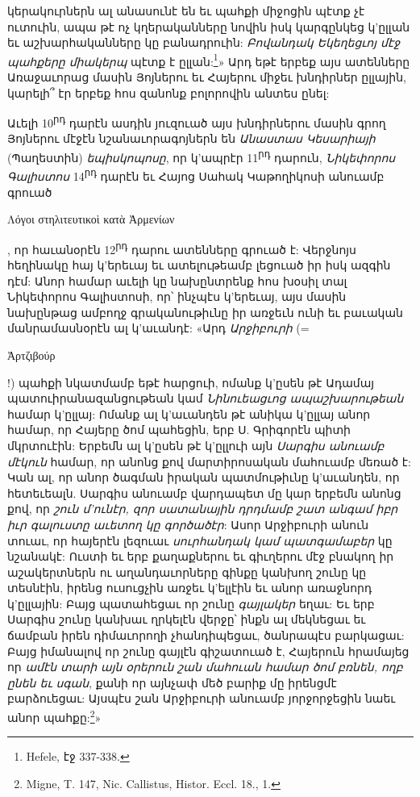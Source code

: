 \documentclass{article}
\begin{document}
{կերակուրներն ալ անասունէ են եւ պահքի միջոցին պէտք չէ ուտուին, ապա թէ ոչ կղերականները նովին իսկ կարգընկեց կ'ըլլան եւ աշխարհականները կը բանադրուին: \emph{Բովանդակ Եկեղեցւոյ մէջ պահքերը միակերպ} պէտք է ըլլան:\footnote{Hefele, էջ 337-338.}» Արդ եթէ երբեք այս ատենները Առաջաւորաց մասին Յոյներու եւ Հայերու միջեւ խնդիրներ ըլլային, կարելի՞ էր երբեք հոս զանոնք բոլորովին անտես ընել:

Աւելի 10\textsuperscript{րդ} դարէն ասդին յուզուած այս խնդիրներու մասին գրող Յոյներու մէջէն նշանաւորագոյներն են \emph{Անաստաս Կեսարիայի} (Պաղեստին) \emph{եպիսկոպոսը}, որ կ'ապրէր 11\textsuperscript{րդ} դարուն, \emph{Նիկեփորոս Գալիստոս} 14\textsuperscript{րդ} դարէն եւ Հայոց Սահակ Կաթողիկոսի անուամբ գրուած \begin{greek}Λόγοι στηλιτευτικοὶ κατὰ Ἀρμενίων\end{greek}, որ հաւանօրէն 12\textsuperscript{րդ} դարու ատենները գրուած է: Վերջնոյս հեղինակը հայ կ'երեւայ եւ ատելութեամբ լեցուած իր իսկ ազգին դէմ: Անոր համար աւելի կը նախընտրենք հոս խօսիլ տալ Նիկեփորոս Գալիստոսի, որ՝ ինչպէս կ'երեւայ, այս մասին նախընթաց ամբողջ գրականութիւնը իր առջեւն ունի եւ բաւական մանրամասնօրէն ալ կ'աւանդէ: «Արդ \emph{Արջիբուրի} (= \begin{greek}Ἀρτζιβούρ\end{greek}!) պահքի նկատմամբ եթէ հարցուի, ոմանք կ'ըսեն թէ Ադամայ պատուիրանազանցութեան կամ \emph{Նինուեացւոց ապաշխարութեան} համար կ'ըլլայ: Ոմանք ալ կ'աւանդեն թէ անիկա կ'ըլլայ անոր համար, որ Հայերը ծոմ պահեցին, երբ Ս. Գրիգորէն պիտի մկրտուէին: Երբեմն ալ կ'ըսեն թէ կ'ըլլուի այն \emph{Սարգիս անուամբ մէկուն} համար, որ անոնց քով մարտիրոսական մահուամբ մեռած է: Կան ալ, որ անոր ծագման իրական պատմութիւնը կ'աւանդեն, որ հետեւեալն. Սարգիս անուամբ վարդապետ մը կար երբեմն անոնց քով, որ \emph{շուն մ'ունէր, զոր սատանային դրդմամբ շատ անգամ իբր իւր գալուստը աւետող կը գործածէր}: Ասոր Արջիբուրի անուն տուաւ, որ հայերէն լեզուաւ \emph{սուրհանդակ կամ պատգամաբեր} կը նշանակէ: Ուստի եւ երբ քաղաքներու եւ գիւղերու մէջ բնակող իր աշակերտներն ու աղանդաւորները գինքը կանխող շունը կը տեսնէին, իրենց ուսուցչին առջեւ կ'ելլէին եւ անոր առաջնորդ կ'ըլլային: Բայց պատահեցաւ որ շունը \emph{գայլակեր} եղաւ: Եւ երբ Սարգիս շունը կանխաւ ղրկելէն վերջը՝ ինքն ալ մեկնեցաւ եւ ճամբան իրեն դիմաւորողի չհանդիպեցաւ, ծանրապէս բարկացաւ: Բայց իմանալով որ շունը գայլէն գիշատուած է, Հայերուն հրամայեց որ \emph{ամէն տարի այն օրերուն շան մահուան համար ծոմ բռնեն, ողբ ընեն եւ սգան}, քանի որ այնչափ մեծ բարիք մը իրենցմէ բարձուեցաւ: Այսպէս շան Արջիբուրի անուամբ յորջորջեցին նաեւ անոր պահքը:\footnote{Migne, T. 147, Nic. Callistus, Histor. Eccl. 18., 1.}»

}
\end{document}
